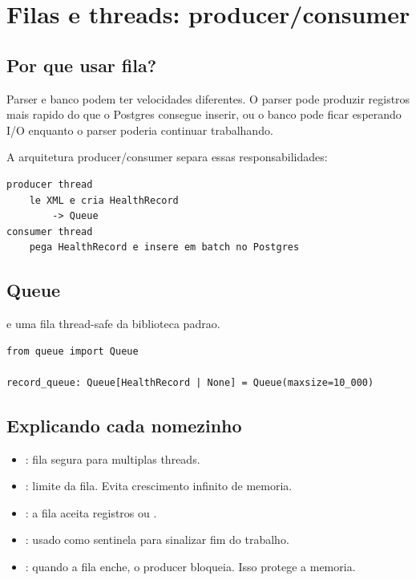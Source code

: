 \chapter{Filas e threads: producer/consumer}

\section{Por que usar fila?}

Parser e banco podem ter velocidades diferentes. O parser pode produzir registros mais rapido do que o Postgres consegue inserir, ou o banco pode ficar esperando I/O enquanto o parser poderia continuar trabalhando.

A arquitetura producer/consumer separa essas responsabilidades:

\begin{verbatim}
producer thread
    le XML e cria HealthRecord
        -> Queue
consumer thread
    pega HealthRecord e insere em batch no Postgres
\end{verbatim}

\section{Queue}

 e uma fila thread-safe da biblioteca padrao.

\begin{lstlisting}[style=devbutterpython]
from queue import Queue

record_queue: Queue[HealthRecord | None] = Queue(maxsize=10_000)
\end{lstlisting}

\section{Explicando cada nomezinho}

\begin{itemize}
  \item {}: fila segura para multiplas threads.
  \item {}: limite da fila. Evita crescimento infinito de memoria.
  \item {}: a fila aceita registros ou .
  \item {}: usado como sentinela para sinalizar fim do trabalho.
  \item {}: quando a fila enche, o producer bloqueia. Isso protege a memoria.
\end{itemize}

